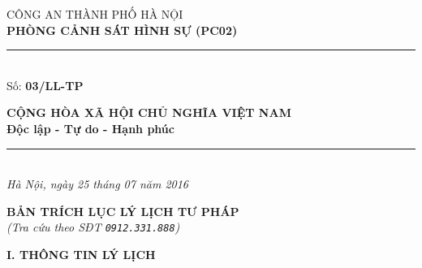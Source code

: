 \documentclass[12pt,a4paper]{article}
\begin{document}
\noindent
\begin{minipage}[t]{0.46\textwidth}
    \begin{center}
        \fontsize{11pt}{13pt}\selectfont
        CÔNG AN THÀNH PHỐ HÀ NỘI\\
        \textbf{PHÒNG CẢNH SÁT HÌNH SỰ (PC02)}\\[-0.2em]
        \rule{3.2cm}{0.6pt}\\[0.25cm]
        \fontsize{11pt}{13pt}\selectfont Số: \textbf{03/LL-TP}
    \end{center}
\end{minipage}
\hfill
\begin{minipage}[t]{0.52\textwidth}
    \begin{center}
        \fontsize{11pt}{13pt}\selectfont
        \textbf{CỘNG HÒA XÃ HỘI CHỦ NGHĨA VIỆT NAM}\\
        \textbf{Độc lập - Tự do - Hạnh phúc}\\[-0.2em]
        \rule{3.6cm}{0.6pt}\\[0.25cm]
        \textit{Hà Nội, ngày 25 tháng 07 năm 2016}
    \end{center}
\end{minipage}

\vspace{0.5cm}

\begin{center}
    \textbf{\Large BẢN TRÍCH LỤC LÝ LỊCH TƯ PHÁP}\\[0.15cm]
    \textit{(Tra cứu theo SĐT \texttt{0912.331.888})}
\end{center}

\vspace{0.3cm}


\vspace{0.3cm}\noindent\textbf{\large I. THÔNG TIN LÝ LỊCH}\\[0.15cm]
\end{document}
